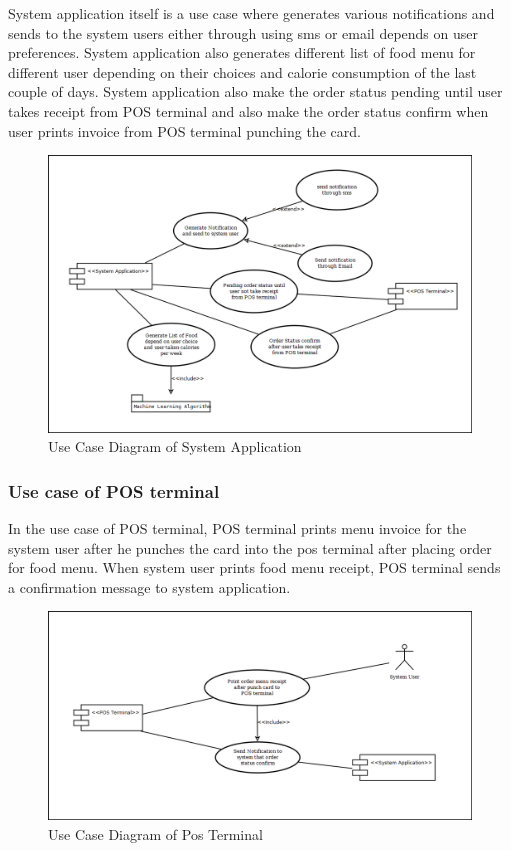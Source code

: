 System application itself is a use case where generates various notifications
and sends to the system users either through using sms or email depends on user
preferences. System application also generates different list of food menu for
different user depending on their choices and calorie consumption of the last
couple of days. System application also make the order status pending until user
takes receipt from POS terminal  and also make the order status confirm when
user prints invoice from POS terminal punching the card.
\begin{figure}[h!t]
    \centering
      \includegraphics[width=5.5in]{ch3/UseCase/SystemApplication}
  \caption{Use Case Diagram of System Application}
  \label{UCSystemApplication}
\end{figure}

\subsubsection{Use case of POS terminal}

In the use case of POS terminal, POS terminal prints menu invoice for the system
user after he punches the card into the pos terminal after placing order for
food menu. When system user prints food menu receipt, POS terminal sends a
confirmation message to system application.
\begin{figure}[h!t]
    \centering
      \includegraphics[width=5.5in]{ch3/UseCase/PosTerminal}
  \caption{Use Case Diagram of Pos Terminal}
  \label{UCPosTerminal}
\end{figure}
\newpage

